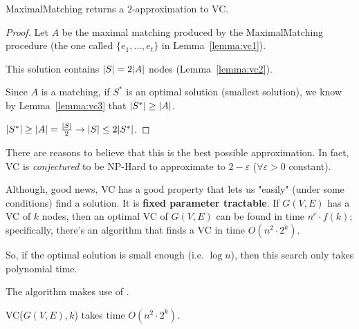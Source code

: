     \begin{theorem}
        MaximalMatching returns a $2$-approximation to VC.\@
    \end{theorem}

    \begin{proof}
        Let $A$ be the maximal matching produced by the MaximalMatching procedure (the one called $\{ e_1, \dots, e_t \}$ in Lemma~\ref{lemma:vc1}).

        This solution contains $\vert S \vert = 2 \vert A \vert$ nodes (Lemma~\ref{lemma:vc2}).

        Since $A$ is a matching, if $S^*$ is an optimal solution (smallest solution), we know by Lemma~\ref{lemma:vc3} that $\vert S^* \vert \geq \vert A \vert$.

        $\vert S^* \vert \geq \vert A \vert = \frac{\vert S \vert}{2} \rightarrow \vert S \vert \leq 2 \vert S^* \vert$.
    \end{proof}

    There are reasons to believe that this is the best possible approximation.
    In fact, VC is \textit{conjectured} to be NP-Hard to approximate to $2 - \varepsilon$ ($\forall \varepsilon > 0$ constant).

    Although, good news, VC has a good property that lets us "easily" (under some conditions) find a solution. It is \textbf{fixed parameter tractable}.
    If $G(V,E)$ has a VC of $k$ nodes, then an optimal VC of $G(V,E)$ can be found in time $n^c \cdot f(k)$; specifically, there's an algorithm that finds a VC in time $O(n^2 \cdot 2^k)$.

    So, if the optimal solution is small enough (i.e. $\log n$), then this search only takes polynomial time.

    The algorithm makes use of .

    

    \begin{lemma}
        VC($G(V,E), k$) takes time $O(n^2 \cdot 2^k)$.
    \end{lemma}

